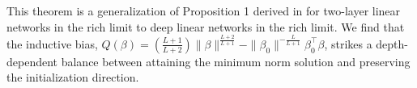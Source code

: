 \documentclass{article}
\theoremstyle{plain}
\newtheorem{lemma}[theorem]{Lemma}
\theoremstyle{definition}
\theoremstyle{remark}
\begin{document}
This theorem is a generalization of Proposition 1 derived in \cite{azulay2021implicit} for two-layer linear networks in the rich limit to deep linear networks in the rich limit. We find that the inductive bias, $Q(\beta) = (\tfrac{L+1}{L+2})\|\beta\|^{\frac{L+2}{L+1}} - \|\beta_0\|^{-\frac{L}{L+1}}\beta_0^\intercal \beta$, strikes a depth-dependent balance between attaining the minimum norm solution and preserving the initialization direction.




\end{document}
